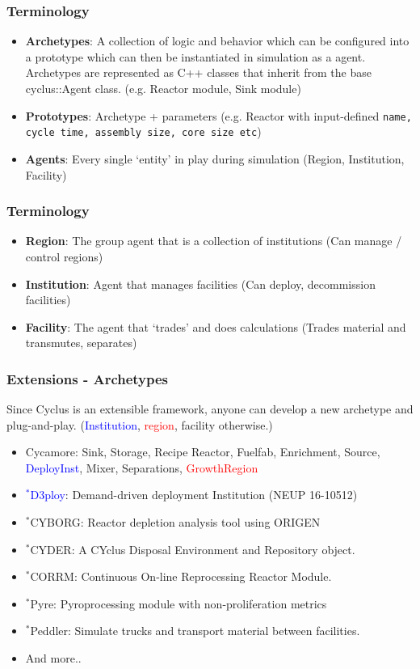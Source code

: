 \begin{frame}
	\frametitle{Terminology}
	\begin{itemize}
		\item \textbf{Archetypes}: A collection of logic and behavior which can be configured into a prototype which can then be instantiated in simulation as a agent. Archetypes are represented as C++ classes that inherit from the base cyclus::Agent class. (e.g. Reactor module, Sink module)
		\item \textbf{Prototypes}: Archetype + parameters (e.g. Reactor with input-defined  \texttt{name, cycle time, assembly size, core size etc})
		\item \textbf{Agents}: Every single `entity' in play during simulation (Region, Institution, Facility)
	\end{itemize}
\end{frame}

\begin{frame}
	\frametitle{Terminology}
	\begin{itemize}
		\item \textbf{Region}: The group agent that is a collection of institutions (Can manage / control regions)
		\item \textbf{Institution}: Agent that manages facilities (Can deploy, decommission facilities)
		\item \textbf{Facility}: The agent that `trades' and does calculations (Trades material and transmutes, separates)
	\end{itemize}
\end{frame}

\begin{frame}
	\frametitle{Extensions - Archetypes}
	Since Cyclus is an extensible framework, anyone can develop a new archetype and plug-and-play. (\textcolor{blue}{Institution}, \textcolor{red}{region}, facility otherwise.)
	\begin{itemize}
		\item Cycamore: Sink, Storage, Recipe Reactor, Fuelfab, Enrichment, Source, \textcolor{blue}{DeployInst}, Mixer, Separations, \textcolor{red}{GrowthRegion}
		\item \textcolor{blue}{$^*$D3ploy}: Demand-driven deployment Institution (NEUP 16-10512) 
		\item $^*$CYBORG: Reactor depletion analysis tool using ORIGEN
		\item $^*$CYDER: A CYclus Disposal Environment and Repository object.
		\item $^*$CORRM: Continuous On-line Reprocessing Reactor Module.
		\item $^*$Pyre: Pyroprocessing module with non-proliferation metrics
        \item $^*$Peddler: Simulate trucks and transport material between facilities.
		\item And more..
	\end{itemize}

\end{frame}

